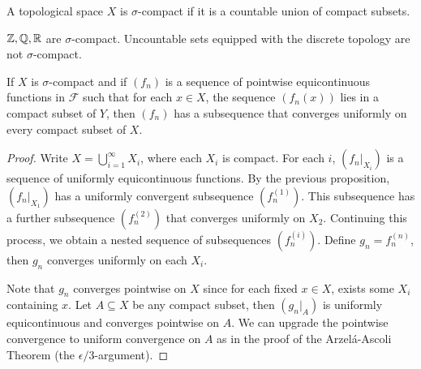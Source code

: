 \begin{df}
    A topological space $X$ is $\sigma$-compact if it is a countable union of compact subsets.
\end{df}

\begin{ex}
    ${\mathbb Z }, {\mathbb Q}, {\mathbb R}$ are $\sigma$-compact. Uncountable sets equipped with the discrete topology are not $\sigma$-compact.
\end{ex}

\begin{prop}
    If $X$ is $\sigma$-compact and if $(f_n)$ is a sequence of pointwise equicontinuous functions in $\mathcal F$ such that for each $x \in X$, the sequence $(f_n(x))$ lies in a compact subset of $Y$, then $(f_n)$ has a subsequence that converges uniformly on every compact subset of $X$.
    \begin{proof}
        Write $X = \bigcup_{i=1}^\infty X_i$, where each $X_i$ is compact. For each $i$, $(f_n|_{X_i})$ is a sequence of uniformly equicontinuous functions. By the previous proposition, $(f_n|_{X_1})$ has a uniformly convergent subsequence $(f_n^{(1)})$. This subsequence has a further subsequence $(f_n^{(2)})$ that converges uniformly on $X_2$. Continuing this process, we obtain a nested sequence of subsequences $(f_n^{(i)})$. Define $g_n = f_n^{(n)}$, then $g_n$ converges uniformly on each $X_i$.

        Note that $g_n$ converges pointwise on $X$ since for each fixed $x \in X$, exists some $X_i$ containing $x$. Let $A \subseteq X$ be any compact subset, then $(g_n|_A)$ is uniformly equicontinuous and converges pointwise on $A$. We can upgrade the pointwise convergence to uniform convergence on $A$ as in the proof of the Arzel\'a-Ascoli Theorem (the $\epsilon/3$-argument).
    \end{proof}
\end{prop}


